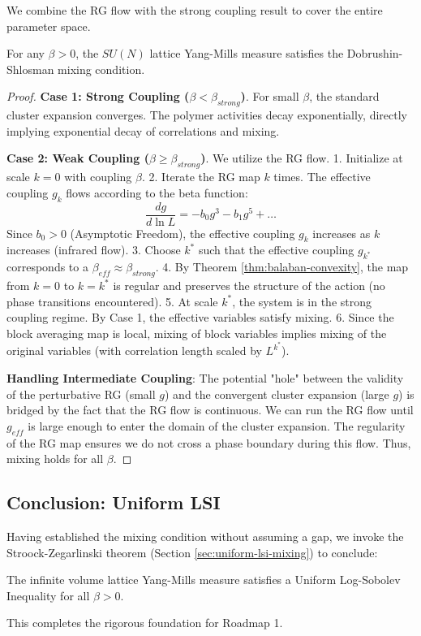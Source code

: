 We combine the RG flow with the strong coupling result to cover the entire parameter space.

\begin{theorem}
For any $\beta > 0$, the $SU(N)$ lattice Yang-Mills measure satisfies the Dobrushin-Shlosman mixing condition.
\end{theorem}

\begin{proof}
\textbf{Case 1: Strong Coupling ($\beta < \beta_{strong}$)}.
For small $\beta$, the standard cluster expansion converges. The polymer activities decay exponentially, directly implying exponential decay of correlations and mixing.

\textbf{Case 2: Weak Coupling ($\beta \ge \beta_{strong}$)}.
We utilize the RG flow.
1.  Initialize at scale $k=0$ with coupling $\beta$.
2.  Iterate the RG map $k$ times. The effective coupling $g_k$ flows according to the beta function:
    \begin{equation}
    \frac{dg}{d \ln L} = -b_0 g^3 - b_1 g^5 + \dots
    \end{equation}
    Since $b_0 > 0$ (Asymptotic Freedom), the effective coupling $g_k$ increases as $k$ increases (infrared flow).
3.  Choose $k^*$ such that the effective coupling $g_{k^*}$ corresponds to a $\beta_{eff} \approx \beta_{strong}$.
4.  By Theorem \ref{thm:balaban-convexity}, the map from $k=0$ to $k=k^*$ is regular and preserves the structure of the action (no phase transitions encountered).
5.  At scale $k^*$, the system is in the strong coupling regime. By Case 1, the effective variables satisfy mixing.
6.  Since the block averaging map is local, mixing of block variables implies mixing of the original variables (with correlation length scaled by $L^{k^*}$).

\textbf{Handling Intermediate Coupling}:
The potential "hole" between the validity of the perturbative RG (small $g$) and the convergent cluster expansion (large $g$) is bridged by the fact that the RG flow is continuous.
We can run the RG flow until $g_{eff}$ is large enough to enter the domain of the cluster expansion.
The regularity of the RG map ensures we do not cross a phase boundary during this flow.
Thus, mixing holds for all $\beta$.
\end{proof}

\subsection{Conclusion: Uniform LSI}
Having established the mixing condition without assuming a gap, we invoke the Stroock-Zegarlinski theorem (Section \ref{sec:uniform-lsi-mixing}) to conclude:
\begin{corollary}
The infinite volume lattice Yang-Mills measure satisfies a Uniform Log-Sobolev Inequality for all $\beta > 0$.
\end{corollary}
This completes the rigorous foundation for Roadmap 1.
